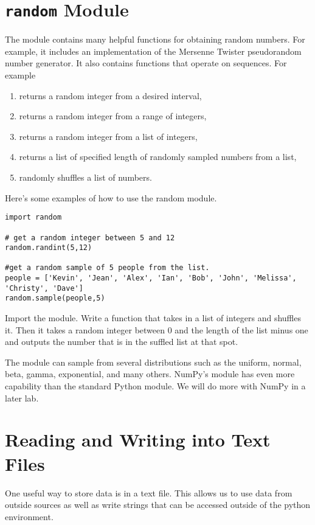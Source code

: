 \section*{\texttt{random} Module}
The  module contains many helpful functions for obtaining random numbers.
For example, it includes an implementation of the Mersenne Twister pseudorandom number generator.
It also contains functions that operate on sequences.  For example
\begin{enumerate}
\item {} returns a random integer from a desired interval,
\item {} returns a random integer from a range of integers,
\item {} returns a random integer from a list of integers,
\item {} returns a list of specified length of randomly sampled numbers from a list,
\item {} randomly shuffles a list of numbers.
\end{enumerate}

Here's some examples of how to use the random module.

\begin{lstlisting}
import random

# get a random integer between 5 and 12
random.randint(5,12)

#get a random sample of 5 people from the list. 
people = ['Kevin', 'Jean', 'Alex', 'Ian', 'Bob', 'John', 'Melissa', 'Christy', 'Dave']
random.sample(people,5)

\end{lstlisting}


\begin{problem}
Import the  module.  Write a function that takes in a list of integers and shuffles it. Then it takes a random integer between 0 and the length of the list minus one and outputs the number that is in the suffled list at that spot.
\end{problem}

The  module can sample from several distributions such as the uniform, normal, beta, gamma, exponential, and many others.
NumPy's  module has even more capability than the standard Python  module.
We will do more with NumPy in a later lab.

\section*{Reading and Writing into Text Files}
One useful way to store data is in a text file.
This allows us to use data from outside sources as well as write strings that can be accessed outside of the python environment.

